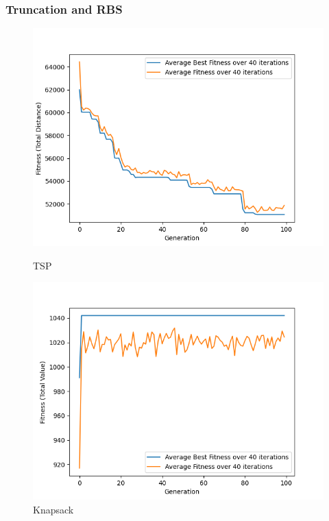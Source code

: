 \documentclass[11pt, letterpaper]{article}
\begin{document}
\subsubsection {Truncation and RBS}
\begin{figure}[H]
  \includegraphics[width=\linewidth]{images/tsp_tr_rb.png}
  \caption{TSP}
\endminipage\hfill
{}
  \includegraphics[width=\linewidth]{images/knapsack_tr_rb.png}
  \caption{Knapsack}
\endminipage\hfill
{}%

\end{figure}
\end{document}
